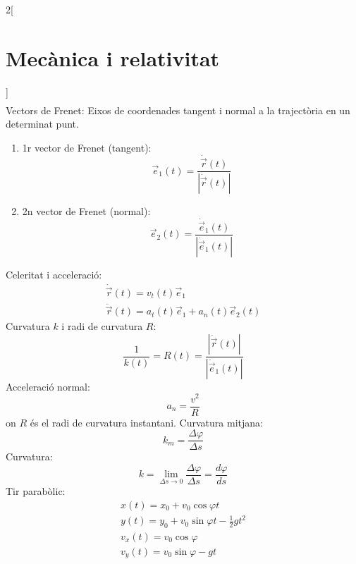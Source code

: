 \documentclass[class=article,10pt,crop=false]{standalone}
\begin{document}
\begin{multicols}{2}[\section{Mecànica i relativitat}]
\begin{gather*}
\end{gather*}
Vectors de Frenet: Eixos de coordenades tangent i normal a la trajectòria en un determinat punt.
\begin{enumerate}
    \item 1r vector de Frenet (tangent):
    $$\Vec{e}_1(t)=\frac{\dot{\Vec{r}}(t)}{|\dot{\Vec{r}}(t)|}$$
    \item 2n vector de Frenet (normal):
    $$\Vec{e}_2(t)=\frac{\dot{\Vec{e}}_1(t)}{|\dot{\Vec{e}}_1(t)|}$$
\end{enumerate}
Celeritat i acceleració:
\begin{gather*}
    \dot{\Vec{r}}(t)=v_t(t)\Vec{e}_1\\
    \ddot{\Vec{r}}(t)=a_t(t)\Vec{e}_1+a_n(t)\Vec{e}_2(t)
\end{gather*}
Curvatura $k$ i radi de curvatura $R$:
$$\frac{1}{k(t)}=R(t)=\frac{|\dot{\Vec{r}}(t)|}{|\dot{\Vec{e}}_1(t)|}$$
Acceleració normal: $$a_n=\frac{v^2}{R}$$ {on $R$ és el radi de curvatura instantani.}\newline
Curvatura mitjana: $$k_m=\frac{\Delta \varphi}{\Delta s}$$
Curvatura: $$k=\lim_{\Delta s\to 0}\frac{\Delta \varphi}{\Delta s}=\frac{d\varphi}{ds}$$
Tir parabòlic:
\begin{gather*}
    x(t)=x_0+v_0\cos\varphi t\\
    y(t)=y_0+v_0\sin\varphi t-\frac{1}{2}gt^2\\
    v_x(t)=v_0\cos\varphi\\
    v_y(t)=v_0\sin\varphi-gt
\end{gather*}

\end{multicols}
\end{document}
